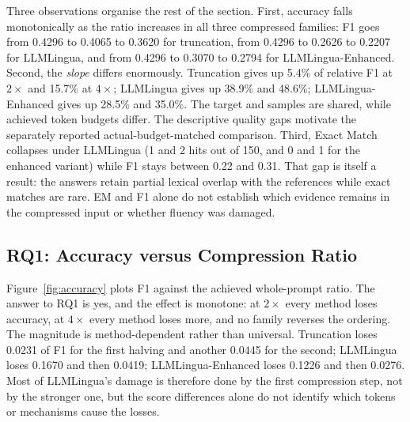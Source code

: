 ﻿\documentclass[10pt,a4paper,twocolumn]{article}
\begin{document}
Three observations organise the rest of the section. First, accuracy falls
monotonically as the ratio increases in all three compressed families: F1 goes
from 0.4296 to 0.4065 to 0.3620 for truncation, from 0.4296 to 0.2626 to 0.2207
for LLMLingua, and from 0.4296 to 0.3070 to 0.2794 for LLMLingua-Enhanced. Second,
the \emph{slope} differs enormously. Truncation gives up 5.4\% of relative F1 at
$2\times$ and 15.7\% at $4\times$; LLMLingua gives up 38.9\% and 48.6\%;
LLMLingua-Enhanced gives up 28.5\% and 35.0\%. The target and samples are shared, while achieved token budgets differ. The descriptive quality gaps motivate the separately reported actual-budget-matched comparison. Third, Exact Match
collapses under LLMLingua (1 and 2 hits out of 150, and 0 and 1 for the enhanced
variant) while F1 stays between 0.22 and 0.31. That gap is itself a result: the
answers retain partial lexical overlap with the references while exact matches are rare. EM and F1 alone do not establish which evidence remains in the compressed input or whether fluency was damaged.

\subsection{RQ1: Accuracy versus Compression Ratio}
\label{sec:rq1}

Figure~\ref{fig:accuracy} plots F1 against the achieved whole-prompt ratio. The
answer to RQ1 is yes, and the effect is monotone: at $2\times$ every method loses
accuracy, at $4\times$ every method loses more, and no family reverses the
ordering. The magnitude is method-dependent rather than universal. Truncation
loses 0.0231 of F1 for the first halving and another 0.0445 for the second;
LLMLingua loses 0.1670 and then 0.0419; LLMLingua-Enhanced loses 0.1226 and then
0.0276. Most of LLMLingua's damage is therefore done by the first compression
step, not by the stronger one, but the score differences alone do not identify which tokens or mechanisms cause the losses.
\end{document}
